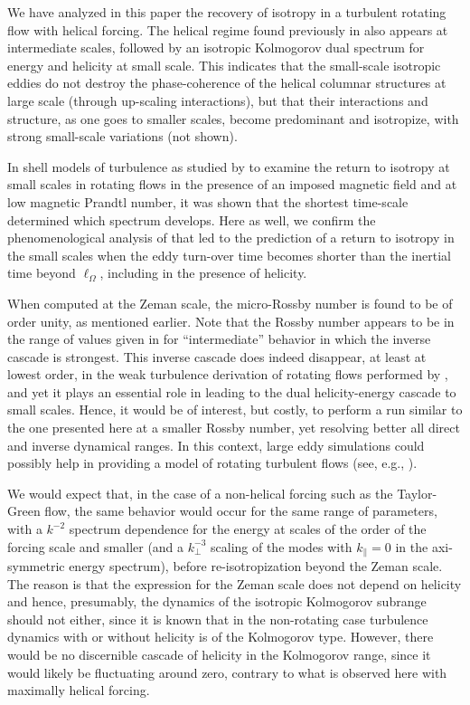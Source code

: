 \documentclass[aps,amsmath,amssymb,floatfix,showpacs]{revtex4}
\begin{document}
We have analyzed in this paper the recovery of isotropy in a turbulent rotating flow with helical forcing. The helical regime found previously in \cite{rot512,1536a} also appears at intermediate scales, followed by an isotropic Kolmogorov dual spectrum for energy and helicity at small scale. This indicates that the small-scale isotropic eddies do not destroy the phase-coherence of the helical columnar structures at large scale (through up-scaling interactions), but that their interactions {and structure}, as one goes to smaller scales, become predominant and isotropize, {with strong small-scale variations (not shown).} 

In shell models of turbulence as studied by \cite{plunian} to examine the return to isotropy at small scales in rotating flows in the presence of an imposed magnetic field and at low magnetic Prandtl number, it was shown that the shortest time-scale determined which spectrum develops. Here as well, we confirm the phenomenological analysis of \cite{zeman} that led to the prediction of a return to isotropy in the small scales when the eddy turn-over time becomes shorter than the inertial time beyond $\ell_{\Omega}$, including in the presence of helicity. 

 When computed at the Zeman scale, the micro-Rossby number is found to be of order unity, as mentioned earlier. Note that the Rossby number appears to be in the range of values given in \cite{bourouiba} for ``intermediate'' behavior in which the inverse cascade is strongest. This inverse cascade does indeed disappear, at least at lowest order, in the weak turbulence derivation of rotating flows performed by \cite{galtier_WT}, and yet it plays an essential role in leading to the dual helicity-energy cascade to small scales. Hence, it would be of interest, but costly, to perform a run similar to the one presented here at a smaller Rossby number, yet resolving better all direct and inverse dynamical ranges. In this context, large eddy simulations could possibly help in providing a model of rotating turbulent flows (see, e.g., \citealt{julien}).

We would expect that, in the case of a non-helical forcing such as the Taylor-Green flow, the same behavior would occur for the same range of parameters, with a $k^{-2}$ spectrum dependence for the energy at scales of the order of the forcing scale and smaller (and a $k_\perp^{-3}$ scaling of the modes with $k_\parallel=0$ in the axi-symmetric energy spectrum), before re-isotropization beyond the Zeman scale. The reason is that the expression for the Zeman scale does not depend on helicity and hence, presumably, the dynamics of the isotropic Kolmogorov subrange should not either, since it is known that in the non-rotating case turbulence dynamics with or without helicity is of the Kolmogorov type. However, there would be no discernible cascade of helicity in the Kolmogorov range, since it would likely be fluctuating around zero, contrary to what is observed here with maximally helical forcing.
\end{document}
